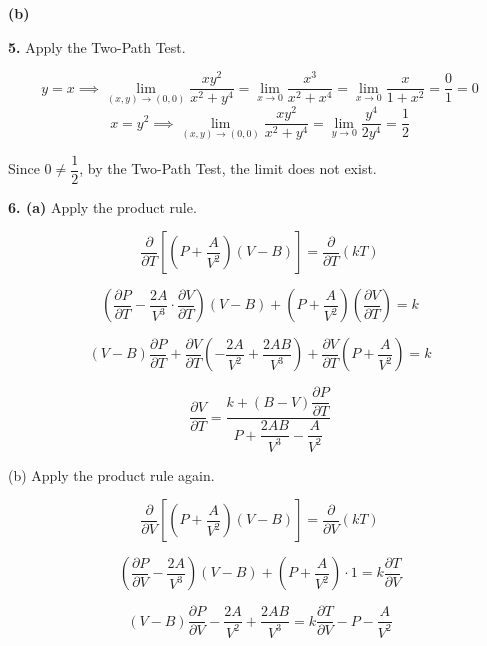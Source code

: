 \documentclass{article}
\begin{document}
\textbf{(b)}
\begin{center}
\end{center}

\newpage

\textbf{5.} Apply the Two-Path Test.

\[y=x\implies\lim_{(x,y)\to(0,0)}\frac{xy^2}{x^2+y^4}=\lim_{x\to0}\frac{x^3}{x^2+x^4}=\lim_{x\to0}\frac{x}{1+x^2}=\frac01=0\]
\[x=y^2\implies\lim_{(x,y)\to(0,0)}\frac{xy^2}{x^2+y^4}=\lim_{y\to0}\frac{y^4}{2y^4}=\frac12\]

Since $0\neq\dfrac12$, by the Two-Path Test, the limit does not exist.

\vspace{1em}

\textbf{6. (a)} Apply the product rule.

\[\frac\partial{\partial T}\left[\left(P+\frac A{V^2}\right)(V-B)\right]=\frac\partial{\partial T}\left(kT\right)\]

\[\left(\frac{\partial P}{\partial T}-\frac{2A}{V^3}\cdot\frac{\partial V}{\partial T}\right)(V-B)+\left(P+\frac A{V^2}\right)\left(\frac{\partial V}{\partial T}\right)=k\]

\[(V-B)\frac{\partial P}{\partial T}+\frac{\partial V}{\partial T}\left(-\frac{2A}{V^2}+\frac{2AB}{V^3}\right)+\frac{\partial V}{\partial T}\left(P+\frac{A}{V^2}\right)=k\]

\[\boxed{\frac{\partial V}{\partial T}=\frac{k+(B-V)\dfrac{\partial P}{\partial T}}{P+\dfrac{2AB}{V^3}-\dfrac{A}{V^2}}}\]

(b) Apply the product rule again.

\[\frac\partial{\partial V}\left[\left(P+\frac A{V^2}\right)(V-B)\right]=\frac\partial{\partial V}\left(kT\right)\]

\[\left(\frac{\partial P}{\partial V}-\frac{2A}{V^3}\right)(V-B)+\left(P+\frac A{V^2}\right)\cdot1=k\frac{\partial T}{\partial V}\]

\[(V-B)\frac{\partial P}{\partial V}-\frac{2A}{V^2}+\frac{2AB}{V^3}=k\frac{\partial T}{\partial V}-P-\frac A{V^2}\]
\end{document}
